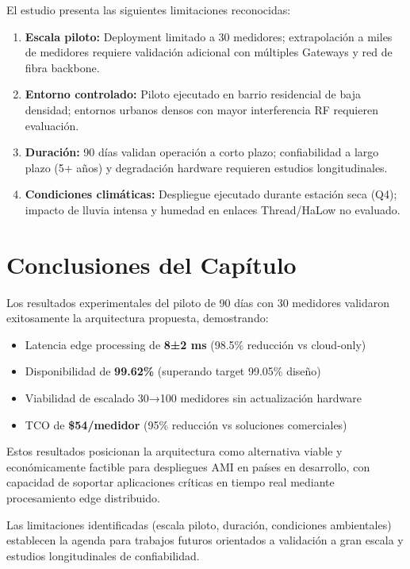 El estudio presenta las siguientes limitaciones reconocidas:

\begin{enumerate}
    \item \textbf{Escala piloto:} Deployment limitado a 30 medidores; extrapolación a miles de medidores requiere validación adicional con múltiples Gateways y red de fibra backbone.
    
    \item \textbf{Entorno controlado:} Piloto ejecutado en barrio residencial de baja densidad; entornos urbanos densos con mayor interferencia RF requieren evaluación.
    
    \item \textbf{Duración:} 90 días validan operación a corto plazo; confiabilidad a largo plazo (5+ años) y degradación hardware requieren estudios longitudinales.
    
    \item \textbf{Condiciones climáticas:} Despliegue ejecutado durante estación seca (Q4); impacto de lluvia intensa y humedad en enlaces Thread/HaLow no evaluado.
\end{enumerate}

\section{Conclusiones del Capítulo}
\label{sec:res-conclusiones}

Los resultados experimentales del piloto de 90 días con 30 medidores validaron exitosamente la arquitectura propuesta, demostrando:

\begin{itemize}
    \item Latencia edge processing de \textbf{8±2 ms} (98.5\% reducción vs cloud-only)
    \item Disponibilidad de \textbf{99.62\%} (superando target 99.05\% diseño)
    \item Viabilidad de escalado 30→100 medidores sin actualización hardware
    \item TCO de \textbf{\$54/medidor} (95\% reducción vs soluciones comerciales)
\end{itemize}

Estos resultados posicionan la arquitectura como alternativa viable y económicamente factible para despliegues AMI en países en desarrollo, con capacidad de soportar aplicaciones críticas en tiempo real mediante procesamiento edge distribuido.

Las limitaciones identificadas (escala piloto, duración, condiciones ambientales) establecen la agenda para trabajos futuros orientados a validación a gran escala y estudios longitudinales de confiabilidad.


